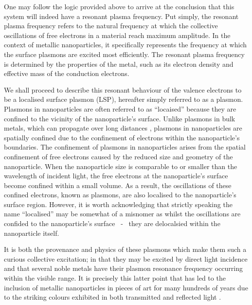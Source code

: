 One may follow the logic provided above to arrive at the conclusion that this system will indeed have a resonant plasma frequency. Put simply, the resonant plasma frequency refers to the natural frequency at which the collective oscillations of free electrons in a material reach maximum amplitude. In the context of metallic nanoparticles, it specifically represents the frequency at which the surface plasmons are excited most efficiently. The resonant plasma frequency is determined by the properties of the metal, such as its electron density and effective mass of the conduction electrons. 

We shall proceed to describe this resonant behaviour of the valence electrons to be a localised surface plasmon (LSP), hereafter simply referred to as a plasmon. Plasmons in nanoparticles are often referred to as ``locaised'' because they are confined to the vicinity of the nanoparticle's surface. Unlike plasmons in bulk metals, which can propagate over long distances \cite{ZAYATS2005131}, plasmons in nanoparticles are spatially confined due to the confinement of electrons within the nanoparticle's boundaries. The confinement of plasmons in nanoparticles arises from the spatial confinement of free electrons caused by the reduced size and geometry of the nanoparticle. When the nanoparticle size is comparable to or smaller than the wavelength of incident light, the free electrons at the nanoparticle's surface become confined within a small volume. As a result, the oscillations of these confined electrons, known as plasmons, are also localised to the nanoparticle's surface region. However, it is worth acknowledging that strictly speaking the name ``localised'' may be somewhat of a misnomer as whilst the oscillations are confided to the nanoparticle's surface ~-~ they are delocalsied within the nanoparticle itself.

It is both the provenance and physics of these plasmons which make them such a curious collective excitation; in that they may be excited by direct light incidence and that several noble metals have their plasmon resonance frequency occurring within the visible range. It is precisely this latter point that has led to the inclusion of metallic nanoparticles in pieces of art for many hundreds of years due to the striking colours exhibited in both transmitted and reflected light \cite{AuPlasmonRev}.

